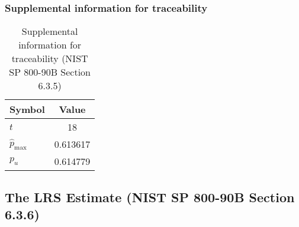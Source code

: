 \documentclass[a3paper,xelatex,english]{bxjsarticle}
\begin{document}
\subsubsection{Supplemental information for traceability}
\renewcommand{\arraystretch}{1.8}
\begin{table}[h]
\caption{Supplemental information for traceability (NIST SP 800-90B Section 6.3.5)}
\begin{center}
\begin{tabular}{|l|c|}
\hline 
\rowcolor{anotherlightblue} %
Symbol				& Value \\ \hline 
$t$				&       18\\ \hline 
$\hat{p}_{\textrm{max}}$ 			& 0.613617\\ \hline
$p_u$				& 0.614779\\ \hline
\end{tabular}
\end{center}
\end{table}
\renewcommand{\arraystretch}{1.4}
\clearpage
\subsection{The LRS Estimate (NIST SP 800-90B Section 6.3.6)}\label{sec:Binary636}
\end{document}
